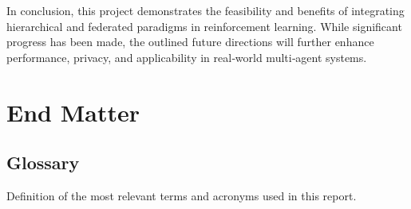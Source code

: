 \documentclass[12pt,a4paper,twoside,openany]{book}
\begin{document}
In conclusion, this project demonstrates the feasibility and benefits of integrating hierarchical and federated paradigms in reinforcement learning. While significant progress has been made, the outlined future directions will further enhance performance, privacy, and applicability in real‑world multi‑agent systems.

\backmatter

\part*{End Matter}

\chapter{Glossary}

Definition of the most relevant terms and acronyms used in this report.

\end{document}
